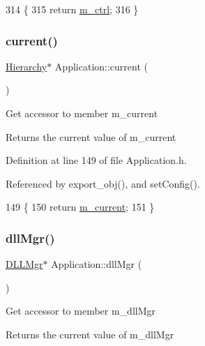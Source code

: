 \begin{DoxyCode}
314                    \{
315     \textcolor{keywordflow}{return} \hyperlink{classApplication_aa371ed989ed34038df400c4d1b41b37f}{m\_ctrl};
316   \}
\end{DoxyCode}
\mbox{\label{classApplication_af25c880ff1e95d863ed058396754a76e}} 
\subsubsection{\texorpdfstring{current()}{current()}}
{\footnotesize\ttfamily \hyperlink{classHierarchy}{Hierarchy}$\ast$ Application\+::current (\begin{DoxyParamCaption}{ }\end{DoxyParamCaption})\hspace{0.3cm}{\ttfamily [inline]}}

Get accessor to member m\+\_\+current \begin{DoxyReturn}{Returns}
the current value of m\+\_\+current 
\end{DoxyReturn}


Definition at line 149 of file Application.\+h.



Referenced by export\+\_\+obj(), and set\+Config().


\begin{DoxyCode}
149                         \{
150     \textcolor{keywordflow}{return} \hyperlink{classApplication_ab0fd877a3c66c41b22109863e1719ccd}{m\_current};
151   \}
\end{DoxyCode}
\mbox{\label{classApplication_a0133c161bf55544f268ca039e174060b}} 
\subsubsection{\texorpdfstring{dll\+Mgr()}{dllMgr()}}
{\footnotesize\ttfamily \hyperlink{classDLLMgr}{D\+L\+L\+Mgr}$\ast$ Application\+::dll\+Mgr (\begin{DoxyParamCaption}{ }\end{DoxyParamCaption})\hspace{0.3cm}{\ttfamily [inline]}}

Get accessor to member m\+\_\+dll\+Mgr \begin{DoxyReturn}{Returns}
the current value of m\+\_\+dll\+Mgr 
\end{DoxyReturn}


